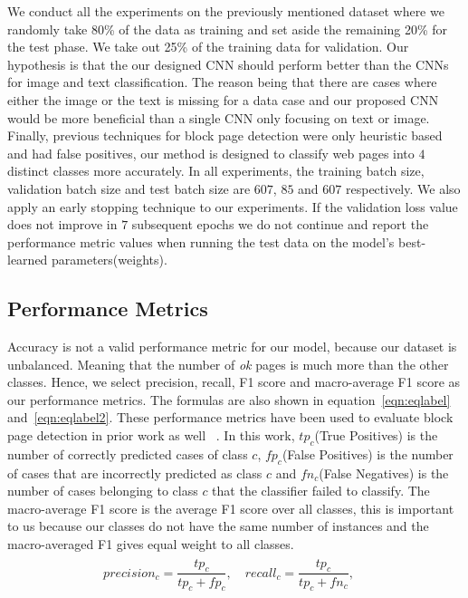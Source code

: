 \documentclass{article} %
\begin{document}
We conduct all the experiments on the previously mentioned dataset where we randomly take 80\% of the data as training and set aside the remaining 20\% for the test phase. We take out 25\% of the training data for validation. Our hypothesis is that the our designed CNN should perform better than the CNNs for image and text classification. The reason being that there are cases where either the image or the text is missing for a data case and our proposed CNN would be more beneficial than a single CNN only focusing on text or image. Finally, previous techniques for block page detection were only heuristic based and had false positives, our method is designed to classify web pages into $4$ distinct classes more accurately. In all experiments, the training batch size, validation batch size and test batch size are $607$, $85$ and $607$ respectively. We also apply an early stopping technique to our experiments. If the validation loss value does not improve in $7$ subsequent epochs we do not continue and report the performance metric values when running the test data on the model's best-learned parameters(weights).

\subsection{Performance Metrics}
Accuracy is not a valid performance metric for our model, because our dataset is unbalanced. Meaning that the number of \textit{ok} pages is much more than the other classes. Hence, we select precision, recall, F1 score and macro-average F1 score as our performance metrics. The formulas are also shown in equation~\ref{eqn:eqlabel} and~\ref{eqn:eqlabel2}. These performance metrics have been used to evaluate block page detection in prior work as well ~\cite{imc14_phillipa}. In this work, $tp_c$(True Positives) is the number of correctly predicted cases of class $c$, $fp_c$(False Positives) is the number of cases that are incorrectly predicted as class $c$ and $fn_c$(False Negatives) is the number of cases belonging to class $c$ that the classifier failed to classify. The macro-average F1 score is the average F1 score over all classes, this is important to us because our classes do not have the same number of instances and the macro-averaged F1 gives equal weight to all classes.
 \begin{align}
\label{eqn:eqlabel}
\begin{split}
 precision_c = \dfrac{tp_c}{tp_c+fp_c} , \quad 
recall_c = \dfrac{tp_c}{tp_c+fn_c}, \quad 
\end{split}
\end{align}
\end{document}
